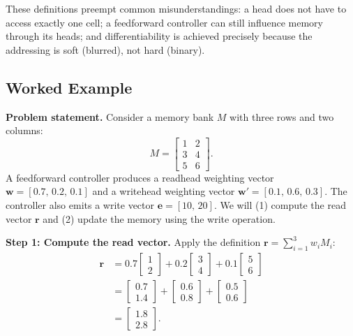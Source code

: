 \documentclass[12pt, a4paper]{article}
\begin{document}
These definitions preempt common misunderstandings: a head does not have to access exactly one cell; a feedforward controller can still influence memory through its heads; and differentiability is achieved precisely because the addressing is soft (blurred), not hard (binary).

\subsection{Worked Example}
\textbf{Problem statement.}  
Consider a memory bank \(M\) with three rows and two columns:
\[
M = \begin{bmatrix}
1 & 2 \\[2pt]
3 & 4 \\[2pt]
5 & 6
\end{bmatrix}.
\]
A feedforward controller produces a readhead weighting vector \(\mathbf{w} = [0.7,\,0.2,\,0.1]\) and a writehead weighting vector \(\mathbf{w}' = [0.1,\,0.6,\,0.3]\).  
The controller also emits a write vector \(\mathbf{e} = [10,\,20]\).  
We will (1) compute the read vector \(\mathbf{r}\) and (2) update the memory using the write operation.

\textbf{Step 1: Compute the read vector.}  
Apply the definition \(\mathbf{r} = \sum_{i=1}^{3} w_i M_i\):
\[
\begin{aligned}
\mathbf{r} &= 0.7 \begin{bmatrix}1 \\ 2\end{bmatrix}
           + 0.2 \begin{bmatrix}3 \\ 4\end{bmatrix}
           + 0.1 \begin{bmatrix}5 \\ 6\end{bmatrix} \\[4pt]
           &= \begin{bmatrix}0.7 \\ 1.4\end{bmatrix}
           + \begin{bmatrix}0.6 \\ 0.8\end{bmatrix}
           + \begin{bmatrix}0.5 \\ 0.6\end{bmatrix} \\[4pt]
           &= \begin{bmatrix}1.8 \\ 2.8\end{bmatrix}.
\end{aligned}
\]
\end{document}
